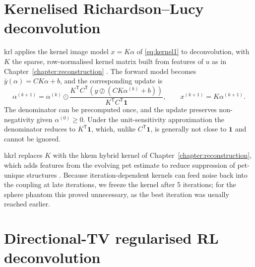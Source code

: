 \section{Kernelised Richardson--Lucy deconvolution}
\label{sec:deconv_krl}

\gls{krl} applies the kernel image model $x=K\alpha$ of \eqref{eq:kernel1} to deconvolution, with $K$ the sparse, row-normalised kernel matrix built from features of $u$ as in Chapter~\ref{chapter:reconstruction} \cite{wangPETImageReconstruction2015,hutchcroftAnatomicallyaidedPETReconstruction2016}. The forward model becomes $\bar y(\alpha)=CK\alpha+b$, and the corresponding  update is
\begin{equation}
    \alpha^{(k+1)}
    =
    \alpha^{(k)} \odot
    \frac{
        K^{\mathsf T}C^{\mathsf T}\!\left(
            y \oslash (C K \alpha^{(k)} + b)
        \right)
    }{
        K^{\mathsf T}C^{\mathsf T}\mathbf{1}
    },
    \qquad
    x^{(k+1)} = K\alpha^{(k+1)}.
    \label{eq:krl_update}
\end{equation}
The denominator can be precomputed once, and the update preserves non-negativity given $\alpha^{(0)}\ge 0$. Under the unit-sensitivity approximation the denominator reduces to $K^{\mathsf T}\mathbf{1}$, which, unlike $C^{\mathsf T}\mathbf{1}$, is generally not close to $\mathbf{1}$ and cannot be ignored.

\gls{hkrl} replaces $K$ with the \gls{hkem} hybrid kernel of Chapter~\ref{chapter:reconstruction}, which adds features from the evolving \gls{pet} estimate to reduce suppression of \gls{pet}-unique structures \cite{deiddaHybridPETMR2019}. Because iteration-dependent kernels can feed noise back into the coupling at late iterations, we freeze the kernel after 5 iterations; for the sphere phantom this proved unnecessary, as the best iteration was usually reached earlier.

\section{Directional-TV regularised RL deconvolution}
\label{sec:deconv_dtv}

